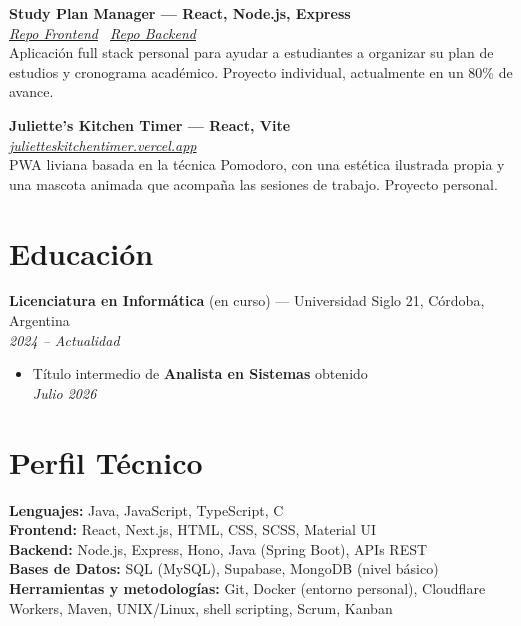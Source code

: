 \documentclass[10pt,a4paper]{article}
\newcommand{\entryheader}[2]{\textbf{#1}\\ \textit{#2}\\[1pt]}
\begin{document}
\vspace{2pt}
\entryheader{Study Plan Manager --- React, Node.js, Express}{\href{https://github.com/lelox028/study-plan-manager-frontend-react}{Repo Frontend} \textbullet\ \href{https://github.com/lelox028/study-plan-manager-api}{Repo Backend}}
Aplicación full stack personal para ayudar a estudiantes a organizar su plan de estudios y cronograma académico. Proyecto individual, actualmente en un 80\% de avance.

\vspace{2pt}
\entryheader{Juliette's Kitchen Timer --- React, Vite}{\href{https://julietteskitchentimer.vercel.app/}{julietteskitchentimer.vercel.app}}
PWA liviana basada en la técnica Pomodoro, con una estética ilustrada propia y una mascota animada que acompaña las sesiones de trabajo. Proyecto personal.

\section*{Educación}
\textbf{Licenciatura en Informática} (en curso) --- Universidad Siglo 21, Córdoba, Argentina\\
\textit{2024 -- Actualidad}
\begin{itemize}
    \item Título intermedio de \textbf{Analista en Sistemas} obtenido\\
    \textit{Julio 2026}
\end{itemize}


\section*{Perfil Técnico}

\textbf{Lenguajes:} Java, JavaScript, TypeScript, C\\
\textbf{Frontend:} React, Next.js, HTML, CSS, SCSS, Material UI\\
\textbf{Backend:} Node.js, Express, Hono, Java (Spring Boot), APIs REST\\
\textbf{Bases de Datos:} SQL (MySQL), Supabase, MongoDB (nivel básico)\\
\textbf{Herramientas y metodologías:} Git, Docker (entorno personal), Cloudflare Workers, Maven, UNIX/Linux, shell scripting, Scrum, Kanban
\end{document}

